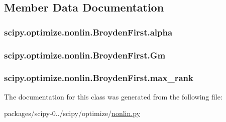 \subsection{Member Data Documentation}
\hypertarget{classscipy_1_1optimize_1_1nonlin_1_1BroydenFirst_a67a0b2e1f4413ab6fd4f256f52e40354}{}
\subsubsection[{alpha}]{\setlength{\rightskip}{0pt plus 5cm}scipy.\+optimize.\+nonlin.\+Broyden\+First.\+alpha}\label{classscipy_1_1optimize_1_1nonlin_1_1BroydenFirst_a67a0b2e1f4413ab6fd4f256f52e40354}
\hypertarget{classscipy_1_1optimize_1_1nonlin_1_1BroydenFirst_a96145b27dbe2012667acdafef3386f36}{}
\subsubsection[{Gm}]{\setlength{\rightskip}{0pt plus 5cm}scipy.\+optimize.\+nonlin.\+Broyden\+First.\+Gm}\label{classscipy_1_1optimize_1_1nonlin_1_1BroydenFirst_a96145b27dbe2012667acdafef3386f36}
\hypertarget{classscipy_1_1optimize_1_1nonlin_1_1BroydenFirst_a1115e034d7bc4f0085d5b8a47c54ee52}{}
\subsubsection[{max\+\_\+rank}]{\setlength{\rightskip}{0pt plus 5cm}scipy.\+optimize.\+nonlin.\+Broyden\+First.\+max\+\_\+rank}\label{classscipy_1_1optimize_1_1nonlin_1_1BroydenFirst_a1115e034d7bc4f0085d5b8a47c54ee52}


The documentation for this class was generated from the following file\+:\begin{DoxyCompactItemize}
\item 
packages/scipy-\/0../scipy/optimize/\hyperlink{nonlin_8py}{nonlin.\+py}\end{DoxyCompactItemize}
